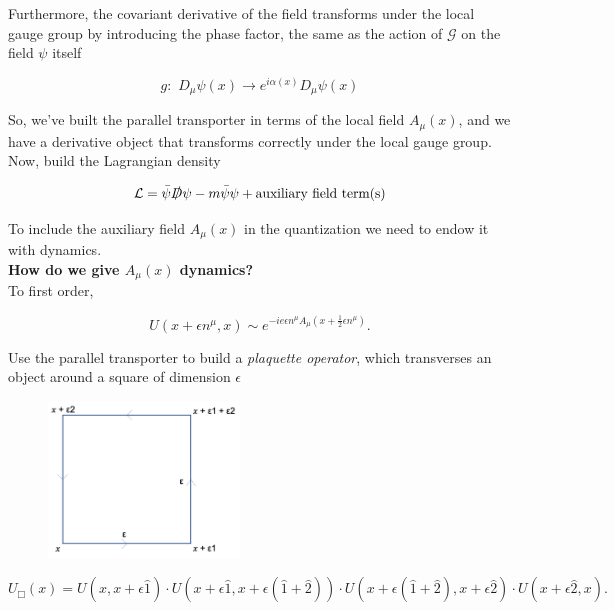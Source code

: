 \noindent Furthermore, the covariant derivative of the field transforms under the local gauge group by introducing the phase factor, the same as the action of $\mathcal{G}$ on the field $\psi$ itself

\begin{equation}
g: \,\, D_\mu \psi (x) \rightarrow e^{i \alpha (x)} D_\mu \psi (x)
\end{equation}

\noindent So, we've built the parallel transporter in terms of the local field $A_\mu (x)$, and we have a derivative object that transforms correctly under the local gauge group. Now, build the Lagrangian density

\begin{equation}
\mathcal{L} = \bar{\psi} \slashed{D} \psi - m \bar{\psi} \psi + \text{auxiliary field term(s)}
\end{equation}

\noindent To include the auxiliary field $A_\mu (x)$ in the quantization we need to endow it with dynamics. \\

\noindent \textbf{How do we give $A_\mu (x)$ dynamics?} \\

\noindent To first order,

\begin{equation}
U(x+\epsilon n^\mu , x) \sim e^{-i e \epsilon n^\mu A_\mu (x + \frac{1}{2} \epsilon n^\mu)}.
\end{equation}

\noindent Use the parallel transporter to build a \textit{plaquette operator}, which transverses an object around a square of dimension $\epsilon$

\begin{figure}[H]
	\centering
	\includegraphics[width=2in]{images/plaquette.png}
\end{figure}

\begin{equation}
U_\Box(x)  = U(x, x + \epsilon \hat{1}) \cdot U (x + \epsilon \hat{1}, x + \epsilon (\hat{1} + \hat{2})) \cdot U(x + \epsilon (\hat{1} + \hat{2}), x + \epsilon \hat{2}) \cdot U(x + \epsilon \hat{2}, x).
\end{equation}


